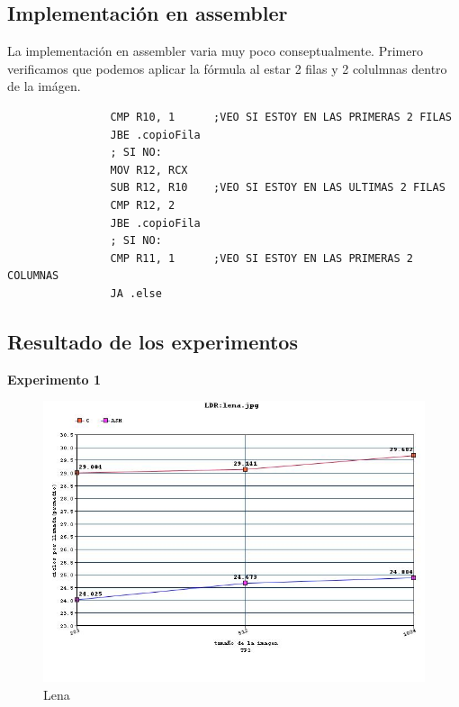 \subsection{Implementaci\'on en assembler}
La implementaci\'on en assembler varia muy poco conseptualmente. Primero verificamos que podemos aplicar la f\'ormula al estar 2 filas y 2 colulmnas dentro de la im\'agen.
\begin{codesnippet}
\begin{verbatim}
				CMP R10, 1 		;VEO SI ESTOY EN LAS PRIMERAS 2 FILAS
				JBE .copioFila
				; SI NO:
				MOV R12, RCX 
				SUB R12, R10 	;VEO SI ESTOY EN LAS ULTIMAS 2 FILAS
				CMP R12, 2
				JBE .copioFila
				; SI NO:
				CMP R11, 1 		;VEO SI ESTOY EN LAS PRIMERAS 2 COLUMNAS
				JA .else
\end{verbatim}
\end{codesnippet}


\subsection{Resultado de los experimentos}

\vspace*{0.3cm} \noindent
\textbf{Experimento 1}

\begin{figure}
  \begin{center}
	\includegraphics[scale=0.66]{imagenes/ldr-lena.jpg}
	\caption{Lena}
	\label{Lena}
  \end{center}
\end{figure}

